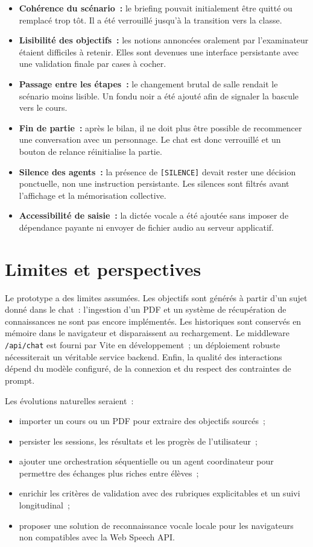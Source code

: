 \documentclass[11pt,a4paper]{article}
\begin{document}
\begin{itemize}
  \item \textbf{Cohérence du scénario~:} le briefing pouvait initialement être quitté ou remplacé trop tôt. Il a été verrouillé jusqu'à la transition vers la classe.
  \item \textbf{Lisibilité des objectifs~:} les notions annoncées oralement par l'examinateur étaient difficiles à retenir. Elles sont devenues une interface persistante avec une validation finale par cases à cocher.
  \item \textbf{Passage entre les étapes~:} le changement brutal de salle rendait le scénario moins lisible. Un fondu noir a été ajouté afin de signaler la bascule vers le cours.
  \item \textbf{Fin de partie~:} après le bilan, il ne doit plus être possible de recommencer une conversation avec un personnage. Le chat est donc verrouillé et un bouton de relance réinitialise la partie.
  \item \textbf{Silence des agents~:} la présence de \texttt{[SILENCE]} devait rester une décision ponctuelle, non une instruction persistante. Les silences sont filtrés avant l'affichage et la mémorisation collective.
  \item \textbf{Accessibilité de saisie~:} la dictée vocale a été ajoutée sans imposer de dépendance payante ni envoyer de fichier audio au serveur applicatif.
\end{itemize}

\section{Limites et perspectives}

Le prototype a des limites assumées. Les objectifs sont générés à partir d'un sujet donné dans le chat~: l'ingestion d'un PDF et un système de récupération de connaissances ne sont pas encore implémentés. Les historiques sont conservés en mémoire dans le navigateur et disparaissent au rechargement. Le middleware \texttt{/api/chat} est fourni par Vite en développement~; un déploiement robuste nécessiterait un véritable service backend. Enfin, la qualité des interactions dépend du modèle configuré, de la connexion et du respect des contraintes de prompt.

Les évolutions naturelles seraient~:

\begin{itemize}
  \item importer un cours ou un PDF pour extraire des objectifs sourcés~;
  \item persister les sessions, les résultats et les progrès de l'utilisateur~;
  \item ajouter une orchestration séquentielle ou un agent coordinateur pour permettre des échanges plus riches entre élèves~;
  \item enrichir les critères de validation avec des rubriques explicitables et un suivi longitudinal~;
  \item proposer une solution de reconnaissance vocale locale pour les navigateurs non compatibles avec la Web Speech API.
\end{itemize}
\end{document}

